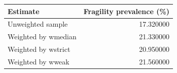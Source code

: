 \begin{tabular}{lr}
\toprule
Estimate & Fragility prevalence (\%) \\
\midrule
Unweighted sample & 17.320000 \\
Weighted by wmedian & 21.330000 \\
Weighted by wstrict & 20.950000 \\
Weighted by wweak & 21.560000 \\
\bottomrule
\end{tabular}
